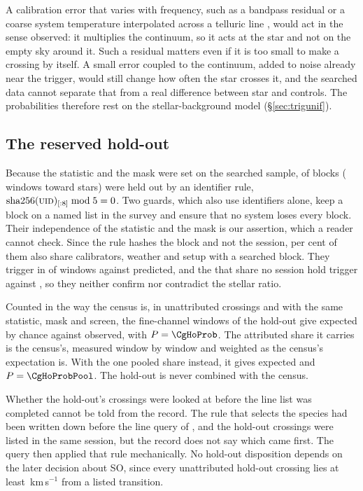 A calibration error that varies with frequency, such as a bandpass residual
or a coarse system temperature interpolated across a telluric line
\citep{ALMATsys2018}, would act in the sense observed: it multiplies the
continuum, so it acts at the star and not on the empty sky around it. Such
a residual matters even if it is too small to make a crossing by itself. A small
error coupled to the continuum, added to noise already near the trigger,
would still change how often the star crosses it, and the searched data
cannot separate that from a real difference between star and controls. The
probabilities therefore rest on the stellar-background model
(\S\ref{sec:trigunif}).

\subsection{The reserved hold-out}
\label{sec:heldout}

Because the statistic and the mask were set on the searched sample,
\NEbHeldOut{} of \NEbProcessedAll{} blocks (\HoWin{} windows toward
\HoStars{} stars) were held out by an identifier rule,
$\mathrm{sha256}(\textsc{uid})_{[:8]} \bmod 5 = 0$. Two guards, which also
use identifiers alone, keep a block on a named list in the survey and ensure
that no system loses every block. Their independence of the statistic and the mask
is our assertion, which a reader cannot check. Since the rule hashes the
block and not the session, \HsSharePct{} per cent of them also share
calibrators, weather and setup with a searched block. They trigger in \StHoObs{} of
\StHoNFine{} windows against \StHoExpFine{} predicted, and the
\HsIndBlocks{} that share no session hold \HsIndObsWord{} trigger
\HsIndObsNoun{} against \HsIndExp, so they neither confirm nor contradict
the stellar ratio.

Counted in the way the census is, in unattributed crossings and with the
same statistic, mask and screen, the \CgHoNWin{} fine-channel windows of the
hold-out give \CgHoExp{} expected by chance against \CgHoObs{} observed, with
$P=\CgHoProb$. The attributed share it carries is the census's, measured
window by window and weighted as the census's expectation is. With the one
pooled share instead, it gives \CgHoExpPool{} expected and
$P=\CgHoProbPool$. The hold-out is never combined with the census.

Whether the hold-out's crossings were looked at before the line list was
completed cannot be told from the record. The rule that selects the species
had been written down before the line query of \MkListDate, and the hold-out
crossings were listed in the same session, but the record does not say which
came first. The query then applied that rule mechanically. No hold-out
disposition depends on the later decision about SO, since every
unattributed hold-out crossing lies at least \CgHoMinDv\,km\,s$^{-1}$ from
a listed transition.

